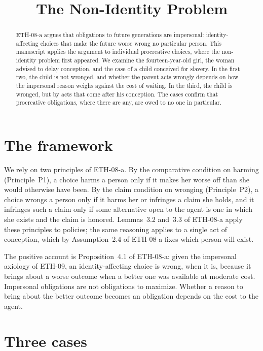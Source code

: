 \documentclass{situationist-preprint}
\title{The Non-Identity Problem}
\begin{document}
\maketitle

\begin{abstract}
ETH-08-a argues that obligations to future generations are impersonal: identity-affecting choices that make the future worse wrong no particular person. This manuscript applies the argument to individual procreative choices, where the non-identity problem first appeared. We examine the fourteen-year-old girl, the woman advised to delay conception, and the case of a child conceived for slavery. In the first two, the child is not wronged, and whether the parent acts wrongly depends on how the impersonal reason weighs against the cost of waiting. In the third, the child is wronged, but by acts that come after his conception. The cases confirm that procreative obligations, where there are any, are owed to no one in particular.
\end{abstract}

\section{The framework}

We rely on two principles of ETH-08-a. By the comparative condition on harming (Principle~P1), a choice harms a person only if it makes her worse off than she would otherwise have been. By the claim condition on wronging (Principle~P2), a choice wrongs a person only if it harms her or infringes a claim she holds, and it infringes such a claim only if some alternative open to the agent is one in which she exists and the claim is honored. Lemmas~3.2 and~3.3 of ETH-08-a apply these principles to policies; the same reasoning applies to a single act of conception, which by Assumption~2.4 of ETH-08-a fixes which person will exist.

The positive account is Proposition~4.1 of ETH-08-a: given the impersonal axiology of ETH-09, an identity-affecting choice is wrong, when it is, because it brings about a worse outcome when a better one was available at moderate cost. Impersonal obligations are not obligations to maximize. Whether a reason to bring about the better outcome becomes an obligation depends on the cost to the agent.

\section{Three cases}
\end{document}
